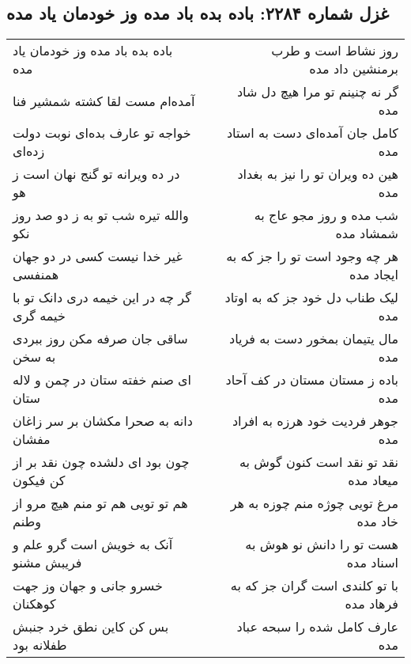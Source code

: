 \begin{center}
\section*{غزل شماره ۲۲۸۴: باده بده باد مده وز خودمان یاد مده}
\label{sec:2284}
\begin{longtable}{l p{0.5cm} r}
باده بده باد مده وز خودمان یاد مده
&&
روز نشاط است و طرب برمنشین داد مده
\\
آمده‌ام مست لقا کشته شمشیر فنا
&&
گر نه چنینم تو مرا هیچ دل شاد مده
\\
خواجه تو عارف بده‌ای نوبت دولت زده‌ای
&&
کامل جان آمده‌ای دست به استاد مده
\\
در ده ویرانه تو گنج نهان است ز هو
&&
هین ده ویران تو را نیز به بغداد مده
\\
والله تیره شب تو به ز دو صد روز نکو
&&
شب مده و روز مجو عاج به شمشاد مده
\\
غیر خدا نیست کسی در دو جهان همنفسی
&&
هر چه وجود است تو را جز که به ایجاد مده
\\
گر چه در این خیمه دری دانک تو با خیمه گری
&&
لیک طناب دل خود جز که به اوتاد مده
\\
ساقی جان صرفه مکن روز ببردی به سخن
&&
مال یتیمان بمخور دست به فریاد مده
\\
ای صنم خفته ستان در چمن و لاله ستان
&&
باده ز مستان مستان در کف آحاد مده
\\
دانه به صحرا مکشان بر سر زاغان مفشان
&&
جوهر فردیت خود هرزه به افراد مده
\\
چون بود ای دلشده چون نقد بر از کن فیکون
&&
نقد تو نقد است کنون گوش به میعاد مده
\\
هم تو تویی هم تو منم هیچ مرو از وطنم
&&
مرغ تویی چوژه منم چوزه به هر خاد مده
\\
آنک به خویش است گرو علم و فریبش مشنو
&&
هست تو را دانش نو هوش به اسناد مده
\\
خسرو جانی و جهان وز جهت کوهکنان
&&
با تو کلندی است گران جز که به فرهاد مده
\\
بس کن کاین نطق خرد جنبش طفلانه بود
&&
عارف کامل شده را سبحه عباد مده
\\
\end{longtable}
\end{center}
